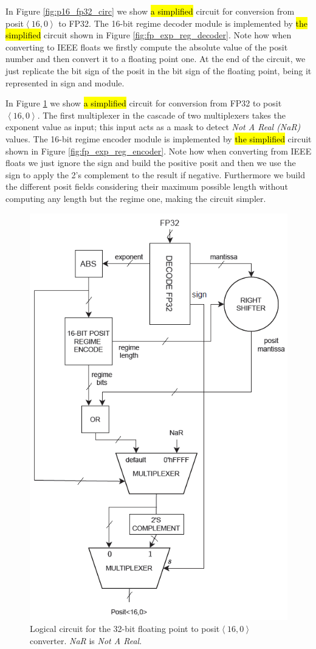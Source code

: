 In Figure \ref{fig:p16_fp32_circ} we show \hl{a simplified} circuit for conversion from posit$\left<16,0\right>$ to FP32. The 16-bit regime decoder module is implemented by \hl{the simplified} circuit shown in Figure \ref{fig:fp_exp_reg_decoder}. Note how when converting to IEEE floats we firstly compute the absolute value of the posit number and then convert it to a floating point one. At the end of the circuit, we just replicate the bit sign of the posit in the bit sign of the floating point, being it represented in sign and module. 


In Figure \ref{fig:fp32_p16_circ} we show \hl{a simplified} circuit for conversion from FP32 to posit$\left<16,0\right>$. The first multiplexer in the cascade of two multiplexers takes the exponent value as input; this input acts as a mask to detect \textit{Not A Real (NaR)} values. The 16-bit regime encoder module is implemented by \hl{the simplified} circuit shown in Figure \ref{fig:fp_exp_reg_encoder}. Note how when converting from IEEE floats we just ignore the sign and build the positive posit and then we use the sign to apply the 2's complement to the result if negative. Furthermore we build the different posit fields considering their maximum possible length without computing any length but the regime one, making the circuit simpler.

\begin{figure}
    \centering
    \includegraphics[width=0.5\linewidth]{img/fp32_p16.PNG}
    \caption{Logical circuit for the 32-bit floating point to posit$\left<16,0\right>$ converter. \textit{NaR} is \textit{Not A Real}.}
    \label{fig:fp32_p16_circ}
\end{figure}


